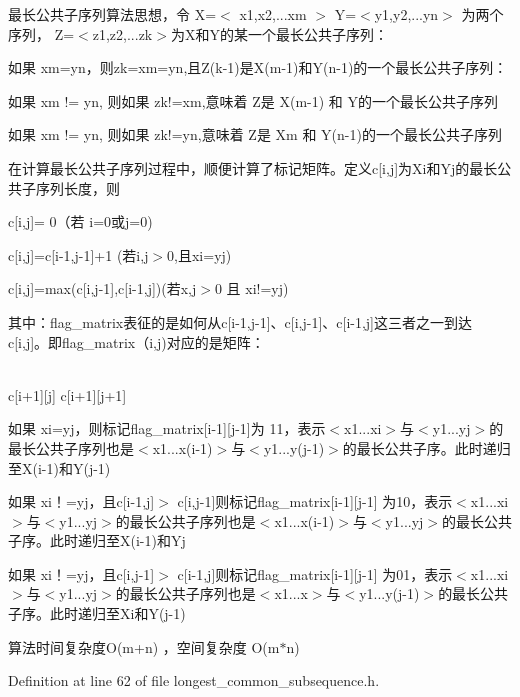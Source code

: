 \begin{DoxyItemize}
\item 最长公共子序列算法思想，令 X=$<$ x1,x2,...xm $>$ Y=$<$y1,y2,...yn$>$ 为两个序列， Z=$<$z1,z2,...zk$>$为\+X和\+Y的某一个最长公共子序列：
\begin{DoxyItemize}
\item 如果 xm=yn，则zk=xm=yn,且\+Z(k-\/1)是\+X(m-\/1)和\+Y(n-\/1)的一个最长公共子序列：
\item 如果 xm != yn, 则如果 zk!=xm,意味着 Z是 X(m-\/1) 和 Y的一个最长公共子序列
\item 如果 xm != yn, 则如果 zk!=yn,意味着 Z是 Xm 和 Y(n-\/1)的一个最长公共子序列
\end{DoxyItemize}

在计算最长公共子序列过程中，顺便计算了标记矩阵。定义c\mbox{[}i,j\mbox{]}为\+Xi和\+Yj的最长公共子序列长度，则
\item c\mbox{[}i,j\mbox{]}= 0（若 i=0或j=0)
\item c\mbox{[}i,j\mbox{]}=c\mbox{[}i-\/1,j-\/1\mbox{]}+1 (若i,j$>$0,且xi=yj)
\item c\mbox{[}i,j\mbox{]}=max(c\mbox{[}i,j-\/1\mbox{]},c\mbox{[}i-\/1,j\mbox{]})(若x,j$>$0 且 xi!=yj)
\end{DoxyItemize}

其中：flag\+\_\+matrix表征的是如何从c\mbox{[}i-\/1,j-\/1\mbox{]}、c\mbox{[}i,j-\/1\mbox{]}、c\mbox{[}i-\/1,j\mbox{]}这三者之一到达c\mbox{[}i,j\mbox{]}。即flag\+\_\+matrix（i,j)对应的是矩阵：

\begin{TabularC}{1}
\hline
{}\\
c\mbox{[}i+1\mbox{]}\mbox{[}j\mbox{]} c\mbox{[}i+1\mbox{]}\mbox{[}j+1\mbox{]} \\
\end{TabularC}

\begin{DoxyItemize}
\item 如果 xi=yj，则标记flag\+\_\+matrix\mbox{[}i-\/1\mbox{]}\mbox{[}j-\/1\mbox{]}为 11，表示$<$x1...xi$>$与$<$y1...\+yj$>$的最长公共子序列也是$<$x1...x(i-\/1)$>$与$<$y1...y(j-\/1)$>$的最长公共子序。此时递归至\+X(i-\/1)和\+Y(j-\/1)
\item 如果 xi！=yj，且c\mbox{[}i-\/1,j\mbox{]}$>$ c\mbox{[}i,j-\/1\mbox{]}则标记flag\+\_\+matrix\mbox{[}i-\/1\mbox{]}\mbox{[}j-\/1\mbox{]} 为10，表示$<$x1...\+xi$>$与$<$y1...\+yj$>$的最长公共子序列也是$<$x1...x(i-\/1)$>$与$<$y1...\+yj$>$的最长公共子序。此时递归至\+X(i-\/1)和\+Yj
\item 如果 xi！=yj，且c\mbox{[}i,j-\/1\mbox{]}$>$ c\mbox{[}i-\/1,j\mbox{]}则标记flag\+\_\+matrix\mbox{[}i-\/1\mbox{]}\mbox{[}j-\/1\mbox{]} 为01，表示$<$x1...\+xi$>$与$<$y1...\+yj$>$的最长公共子序列也是$<$x1...\+x$>$与$<$y1...y(j-\/1)$>$的最长公共子序。此时递归至\+Xi和\+Y(j-\/1)
\end{DoxyItemize}

算法时间复杂度\+O(m+n) ，空间复杂度 O(m$\ast$n) 

Definition at line 62 of file longest\+\_\+common\+\_\+subsequence.\+h.

